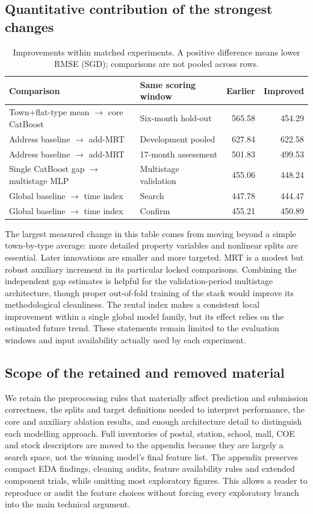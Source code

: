 \documentclass[10pt,a4paper]{article}
\begin{document}
\subsection{Quantitative contribution of the strongest changes}
\begin{table}[htbp]\centering\small
\caption{Improvements within matched experiments. A positive difference means lower RMSE (SGD); comparisons are not pooled across rows.}\label{tab:deltas}
\begin{tabularx}{\linewidth}{@{}Xlrr@{}}\toprule
Comparison & Same scoring window & Earlier & Improved\\\midrule
Town+flat-type mean $\rightarrow$ core CatBoost & Six-month hold-out & 565.58 & 454.29\\
Address baseline $\rightarrow$ add-MRT & Development pooled & 627.84 & 622.58\\
Address baseline $\rightarrow$ add-MRT & 17-month assessment & 501.83 & 499.53\\
Single CatBoost gap $\rightarrow$ multistage MLP & Multistage validation & 455.06 & 448.24\\
Global baseline $\rightarrow$ time index & Search & 447.78 & 444.47\\
Global baseline $\rightarrow$ time index & Confirm & 455.21 & 450.89\\\bottomrule
\end{tabularx}\end{table}

The largest measured change in this table comes from moving beyond a simple town-by-type average: more detailed property variables and nonlinear splits are essential. Later innovations are smaller and more targeted. MRT is a modest but robust auxiliary increment in its particular locked comparisons. Combining the independent gap estimates is helpful for the validation-period multistage architecture, though proper out-of-fold training of the stack would improve its methodological cleanliness. The rental index makes a consistent local improvement within a single global model family, but its effect relies on the estimated future trend. These statements remain limited to the evaluation windows and input availability actually used by each experiment.

\subsection{Scope of the retained and removed material}
We retain the preprocessing rules that materially affect prediction and submission correctness, the splits and target definitions needed to interpret performance, the core and auxiliary ablation results, and enough architecture detail to distinguish each modelling approach. Full inventories of postal, station, school, mall, COE and stock descriptors are moved to the appendix because they are largely a search space, not the winning model's final feature list. The appendix preserves compact EDA findings, cleaning audits, feature availability rules and extended component trials, while omitting most exploratory figures. This allows a reader to reproduce or audit the feature choices without forcing every exploratory branch into the main technical argument.
\end{document}

